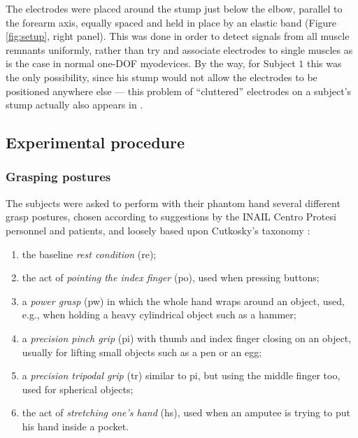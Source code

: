 \documentclass[review,authoryear]{elsarticle}
\def\re{\textsf{re}}
\def\po{\textsf{po}}
\def\pw{\textsf{pw}}
\def\pi{\textsf{pi}}
\def\tr{\textsf{tr}}
\def\hs{\textsf{hs}}
\renewcommand{\cite}{\citep}
\begin{document}
The electrodes were placed around the stump just below the elbow, parallel
to the forearm axis, equally spaced and held in place by an elastic band
(Figure \ref{fig:setup}, right panel). This was done
in order to detect signals from all muscle remnants uniformly,
rather than try and associate electrodes to single muscles
as is the case in normal one-DOF myodevices. By the way, for Subject $1$
this was the only possibility, since his stump
would not allow the electrodes to be positioned anywhere else --- this problem
of ``cluttered'' electrodes on a subject's stump actually also appears in
\cite{sebelius}.

\subsection{Experimental procedure}

\subsubsection{Grasping postures}

The subjects were asked to perform with their phantom hand several
different grasp postures, chosen according to suggestions by the
INAIL Centro Protesi personnel and patients, and loosely based upon
Cutkosky's taxonomy \cite{cutkosky}:

\begin{enumerate}

  \item the baseline \emph{rest condition} (\re);

  \item the act of \emph{pointing the index finger} (\po), used when pressing buttons;

  \item a \emph{power grasp} (\pw) in which the whole hand wraps around an object,
	used, e.g., when holding a heavy cylindrical object such as a hammer;
		
  \item a \emph{precision pinch grip} (\pi) with thumb and index finger closing on
 	an object, usually for lifting small objects such as a pen or an egg;
	
  \item a \emph{precision tripodal grip} (\tr) similar to \pi, but using the
	middle finger too, used for spherical objects;
		
  \item the act of \emph{stretching one's hand} (\hs), used when an amputee is trying
	to put his hand inside a pocket. 

\end{enumerate}
	
\end{document}
